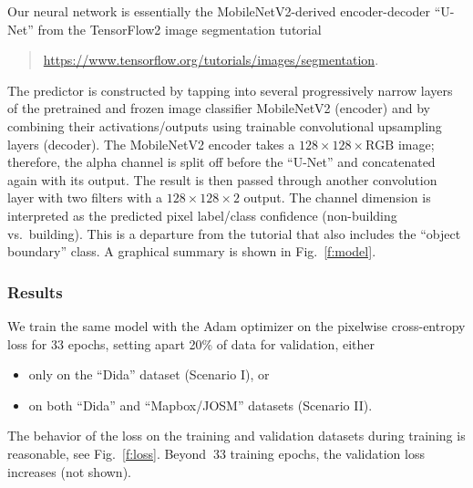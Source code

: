 \documentclass[12pt,a4paper]{article}
\begin{document}
    Our neural network
    is essentially 
    the MobileNetV2-derived
    encoder-decoder ``U-Net''
    from the TensorFlow2 image segmentation tutorial
    \begin{quote}
        \href{https://www.tensorflow.org/tutorials/images/segmentation}{https://www.tensorflow.org/tutorials/images/segmentation}.
    \end{quote}
    The predictor is 
    constructed 
    by tapping into several 
    progressively narrow layers 
    of the pretrained and frozen
    image classifier MobileNetV2 (encoder)
    and
    by combining their activations/outputs using 
    trainable 
    convolutional
    upsampling layers (decoder).
    The MobileNetV2 encoder 
    takes a $128 \times 128 \times \text{RGB}$ image;
    therefore,
    the alpha channel is split off
    before the ``U-Net''
    and 
    concatenated again with its output.
    The result is then passed through another
    convolution layer with two filters
    with a $128 \times 128 \times 2$ output.
    The channel dimension is 
    interpreted as the predicted pixel label/class confidence
    (non-building vs.~building).
    This is a departure from the tutorial
    that also includes the ``object boundary'' class.
    A graphical summary is shown in Fig.~\ref{f:model}.
    
    
    

    \subsubsection*{Results}
    
    We train the same model with the Adam optimizer on 
    the pixelwise cross-entropy loss 
    for 33 epochs,
    setting apart 20\% of data for validation,
    either 
    \begin{itemize}
    \item 
        only on the ``Dida'' dataset (Scenario I), or
    \item
        on both ``Dida'' and ``Mapbox/JOSM'' datasets (Scenario II).
    \end{itemize}
    
    The behavior of the loss on the training and validation datasets
    during training
    is reasonable, see Fig.~\ref{f:loss}.
    Beyond $~$33 training epochs, the validation loss increases (not shown).
    
\end{document}
